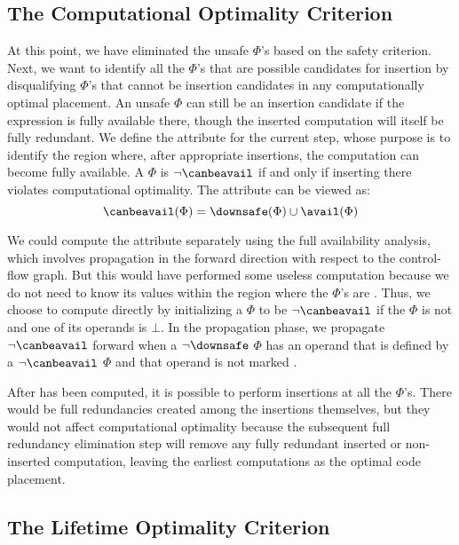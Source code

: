 \subsection{The Computational Optimality Criterion}

At this point, we have eliminated the unsafe $\Phi$'s based on the safety criterion. 
Next, we want to identify all the $\Phi$'s that are possible candidates for insertion by disqualifying $\Phi$'s that cannot be insertion candidates in any computationally optimal placement. 
An unsafe $\Phi$ can still be an insertion candidate if the expression is fully available there, though the inserted computation will itself be fully redundant. 
We define the \canbeavail{} attribute for the current step, whose purpose is to identify the region where, after appropriate insertions, the computation can become fully available. 
A $\Phi$ is $\neg \canbeavail$ if and only if inserting there violates computational optimality. 
The \canbeavail attribute can be viewed as:
$$ \canbeavail(\Phi) = \downsafe(\Phi) \cup \avail(\Phi) $$

We could compute the \avail{} attribute separately using the full availability analysis, which involves propagation in the forward direction with respect to the control-flow graph. 
But this would have performed some useless computation because we do not need to know its values within the region where the $\Phi$'s are \downsafe. 
Thus, we choose to compute \canbeavail directly by initializing a $\Phi$ to be $\neg \canbeavail$ if the $\Phi$ is not \downsafe and one of its operands is $\bot$. 
In the propagation phase, we propagate $\neg \canbeavail$ forward when a $\neg \downsafe$ $\Phi$ has an operand that is defined by a $\neg \canbeavail$ $\Phi$ and that operand is not marked \hasrealuse.

After \canbeavail has been computed, it is possible to perform insertions at all the \canbeavail $\Phi$'s. 
There would be full redundancies created among the insertions themselves, but they would not affect computational optimality because the subsequent full redundancy elimination step will remove any fully redundant inserted or non-inserted computation, leaving the earliest computations as the optimal code placement.

\subsection{The Lifetime Optimality Criterion}

